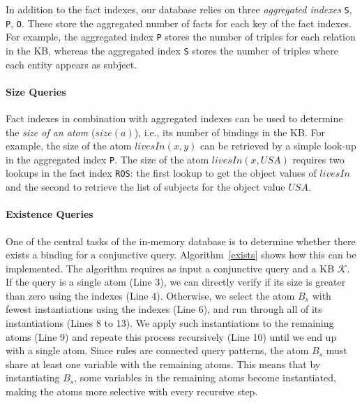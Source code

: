 % 

In addition to the fact indexes, our database relies on three \emph{aggregated indexes} \texttt{S}, \texttt{P}, \texttt{O}. These store the aggregated number of facts for each
key of the fact indexes. For example, the aggregated index \texttt{P} stores the number of triples for each relation in the KB, whereas the aggregated index \texttt{S} stores the number of triples where each entity appears as subject. 

\paragraph{Size Queries} Fact indexes in combination with aggregated indexes can be used to determine the \emph{size of an atom} ($size(a)$), i.e., its number of bindings in the KB. For example, the size of the atom $livesIn(x,y)$ can be retrieved by a simple look-up 
in the aggregated index \texttt{P}. The size of the atom $livesIn(x, USA)$ requires two 
lookups in the fact index \texttt{ROS}: the first lookup to get the object values of $livesIn$ and the second
to retrieve the list of subjects for the object value $USA$.

\paragraph{Existence Queries} One of the central tasks of the in-memory database is to determine whether there exists a binding for a conjunctive query. Algorithm~\ref{exists} shows how this can be implemented.  The algorithm requires as input a conjunctive query and a KB $\mathcal{K}$.
If the query is a single atom (Line 3), we can directly verify if its size is greater than zero using
the indexes (Line 4). Otherwise, we select the atom $B_s$ with fewest instantiations using the indexes (Line 6), 
and run through all of its instantiations (Lines 8 to 13). We apply such instantiations to the remaining atoms (Line 9)
and repeate this process recursively (Line 10) until we end up with a single atom. Since rules are connected query patterns, the atom $B_s$ must share at least
one variable with the remaining atoms. This means that by instantiating $B_s$, some variables in the remaining atoms 
become instantiated, making the atoms more selective with every recursive step.

